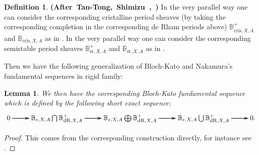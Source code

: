 \documentclass[12pt]{amsart}
\newtheorem{lemma}[theorem]{Lemma}
\theoremstyle{definition}
\newtheorem{definition}[theorem]{Definition}
\numberwithin{equation}{section}
\begin{document}
\begin{definition} \mbox{\bf{(After Tan-Tong, Shimizu \cite[Section 2.1]{TT}, \cite[Section 2]{Shi})}}
In the very parallel way one can consider the corresponding cristalline period sheaves (by taking the corresponding completion in the corresponding de Rham periods above) $\mathbb{B}^+_{\mathrm{cris},X,A}$ and $\mathbb{B}_{\mathrm{cris},X,A}$ as in \cite[Section 2.1]{TT}. In the very parallel way one can consider the corresponding semistable period sheaves $\mathbb{B}^+_{\mathrm{st},X,A}$ and $\mathbb{B}_{\mathrm{st},X,A}$ as in \cite[Section 2]{Shi}.
\end{definition}







Then we have the following generalization of Bloch-Kato \cite{BK1} and Nakamura's \cite{Nakamura1} fundamental sequences in rigid family:



\begin{lemma}  
We then have the corresponding Bloch-Kato fundamental sequence which is defined by the following short exact sequence:
\[
\xymatrix@R+0pc@C+0pc{
0\ar[r] \ar[r] \ar[r] &\mathbb{B}_{e,X,A}\bigcap \mathbb{B}^+_{\mathrm{dR},X,A}    \ar[r] \ar[r] \ar[r]  &\mathbb{B}_{e,X,A}\bigoplus \mathbb{B}^+_{\mathrm{dR},X,A} \ar[r] \ar[r] \ar[r] &\mathbb{B}_{e,X,A}\bigcup \mathbb{B}^+_{\mathrm{dR},X,A} \ar[r] \ar[r] \ar[r] &0 .
}
\]
\end{lemma}


\begin{proof}
This comes from the corresponding construction directly, for instance see \cite[Definition 4.8.2]{KL16}.	
\end{proof}
\end{document}
